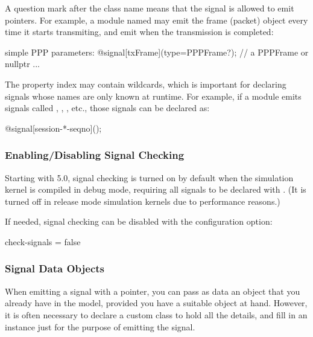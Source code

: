 \begin{ned}
A question mark after the class name means that the signal is allowed to
emit  pointers. For example, a module named  may emit
the frame (packet) object every time it starts transmiting, and emit
 when the transmission is completed:

\begin{ned}
simple PPP
{
    parameters:
        @signal[txFrame](type=PPPFrame?);  // a PPPFrame or nullptr
        ...
}
\end{ned}

The property index may contain wildcards, which is important for declaring
signals whose names are only known at runtime. For example, if a module emits
signals called , , ,
etc., those signals can be declared as:

\begin{ned}
    @signal[session-*-seqno]();
\end{ned}


\subsubsection{Enabling/Disabling Signal Checking}
\label{sec:simple-modules:enabling-signal-checking}

Starting with {\opp} 5.0, signal checking is turned on by default when the
simulation kernel is compiled in debug mode, requiring all signals to be
declared with . (It is turned off in release mode
simulation kernels due to performance reasons.)

If needed, signal checking can be disabled with the 
configuration option:

\begin{inifile}
check-signals = false
\end{inifile}


\subsubsection{Signal Data Objects}
\label{sec:simple-modules:signal-data-objects}

When emitting a signal with a  pointer, you can pass as data
an object that you already have in the model, provided you have a suitable
object at hand. However, it is often necessary to declare a custom class
to hold all the details, and fill in an instance just for the purpose of
emitting the signal.


\end{ned}
